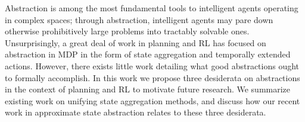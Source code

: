Abstraction is among the most fundamental tools to intelligent agents operating in complex spaces; through abstraction, intelligent agents may pare down otherwise prohibitively large problems into tractably solvable ones. Unsurprisingly, a great deal of work in planning and \ac{RL} has focused on abstraction in \ac{MDP} in the form of state aggregation and temporally extended actions. However, there exists little work detailing what good abstractions ought to formally accomplish. In this work we propose three desiderata on abstractions in the context of planning and \ac{RL} to motivate future research. We summarize existing work on unifying state aggregation methods, and discuss how our recent work in approximate state abstraction relates to these three desiderata.